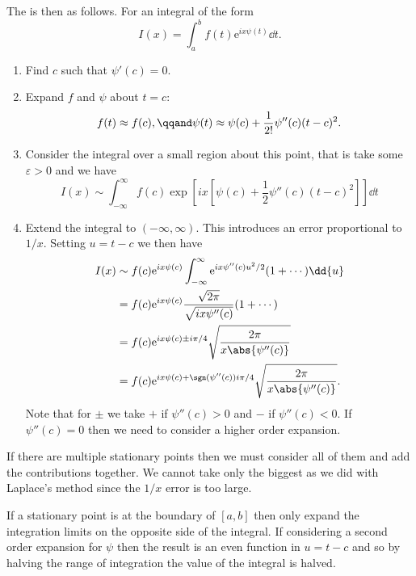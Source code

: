 \documentclass[fleqn]{NotesClass}
\newcommand*{\e}{\mathrm{e}}
\begin{document}
    The  is then as follows.
    For an integral of the form
    \begin{equation}
        I(x) = \int_a^b f(t)\e^{ix\psi(t)} \dd{t}.
    \end{equation}
    \begin{enumerate}
        \item Find \(c\) such that \(\psi'(c) = 0\).
        \item Expand \(f\) and \(\psi\) about \(t = c\):
        \begin{equation}
            f(t) \approx f(c), \qqand \psi(t) \approx \psi(c) + \frac{1}{2!}\psi''(c)(t - c)^2.
        \end{equation}
        \item Consider the integral over a small region about this point, that is take some \(\varepsilon > 0\) and we have
        \begin{equation}
            I(x) \sim \int_{-\infty}^{\infty} f(c)\exp\left[ ix\left[ \psi(c) + \frac{1}{2}\psi''(c)(t - c)^2 \right] \right] \dd{t}
        \end{equation}
        \item Extend the integral to \((-\infty, \infty)\).
        This introduces an error proportional to \(1/x\).
        Setting \(u = t - c\) we then have
        \begin{align}
            I(x) &\sim f(c) \e^{ix\psi(c)} \int_{-\infty}^{\infty} \e^{ix\psi''(c)u^2/2}(1 + \dotsb) \dd{u}\\
            &= f(c)\e^{ix\psi(c)} \frac{\sqrt{2\pi}}{\sqrt{ix\psi''(c)}}(1 + \dotsb)\\
            &= f(c) \e^{ix\psi(c) \pm i\pi/4} \sqrt{\frac{2\pi}{x\abs{\psi''(c)}}}\\
            &= f(c) \e^{ix\psi(c) + \sgn(\psi''(c))i\pi/4}\sqrt{\frac{2\pi}{x\abs{\psi''(c)}}}.
        \end{align}
        Note that for \(\pm\) we take \(+\) if \(\psi''(c) > 0\) and \(-\) if \(\psi''(c) < 0\).
        If \(\psi''(c) = 0\) then we need to consider a higher order expansion.
    \end{enumerate}
    
    If there are multiple stationary points then we must consider all of them and add the contributions together.
    We cannot take only the biggest as we did with Laplace's method since the \(1/x\) error is too large.
    
    If a stationary point is at the boundary of \([a, b]\) then only expand the integration limits on the opposite side of the integral.
    If considering a second order expansion for \(\psi\) then the result is an even function in \(u = t - c\) and so by halving the range of integration the value of the integral is halved.
    
\end{document}
